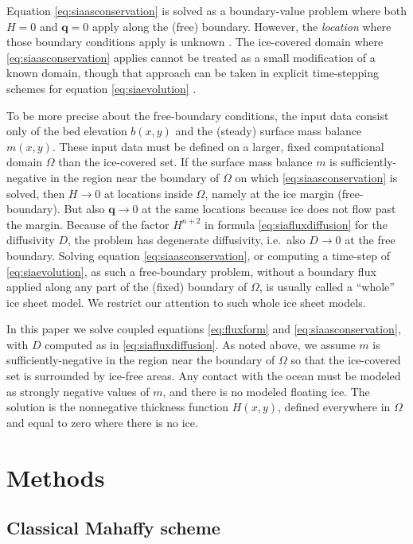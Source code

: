 \documentclass[review,letterpaper]{igs}
\newcommand\bq{\mathbf{q}}
\begin{document}
Equation \eqref{eq:siaasconservation} is solved as a boundary-value problem where both $H=0$ and $\bq=0$ apply along the (free) boundary.  However, the \emph{location} where those boundary conditions apply is unknown \citep{JouvetBueler2012,JaroschSchoofAnslow2013}.  The ice-covered domain where \eqref{eq:siaasconservation} applies cannot be treated as a small modification of a known domain, though that approach can be taken in explicit time-stepping schemes for equation \eqref{eq:siaevolution} \citep{Huybrechtsetal1996,Bueleretal2005}.

To be more precise about the free-boundary conditions, the input data consist only of the bed elevation $b(x,y)$ and the (steady) surface mass balance $m(x,y)$.  These input data must be defined on a larger, fixed computational domain $\Omega$ than the ice-covered set.  If the surface mass balance $m$ is sufficiently-negative in the region near the boundary of $\Omega$ on which \eqref{eq:siaasconservation} is solved, then $H\to 0$ at locations inside $\Omega$, namely at the ice margin (free-boundary).  But also $\bq \to 0$ at the same locations because ice does not flow past the margin.  Because of the factor $H^{n+2}$ in formula \eqref{eq:siafluxdiffusion} for the diffusivity $D$, the problem has degenerate diffusivity, i.e.~also $D \to 0$ at the free boundary.  Solving equation \eqref{eq:siaasconservation}, or computing a time-step of \eqref{eq:siaevolution}, as such a free-boundary problem, without a boundary flux applied along any part of the (fixed) boundary of $\Omega$, is usually called a ``whole'' ice sheet model.  We restrict our attention to such whole ice sheet models.

In this paper we solve coupled equations \eqref{eq:fluxform} and \eqref{eq:siaasconservation}, with $D$ computed as in \eqref{eq:siafluxdiffusion}.  As noted above, we assume $m$ is sufficiently-negative in the region near the boundary of $\Omega$ so that the ice-covered set is surrounded by ice-free areas.  Any contact with the ocean must be modeled as strongly negative values of $m$, and there is no modeled floating ice.  The solution is the nonnegative thickness function $H(x,y)$, defined everywhere in $\Omega$ and equal to zero where there is no ice.


\section{Methods}

\subsection{Classical Mahaffy scheme}
\end{document}
